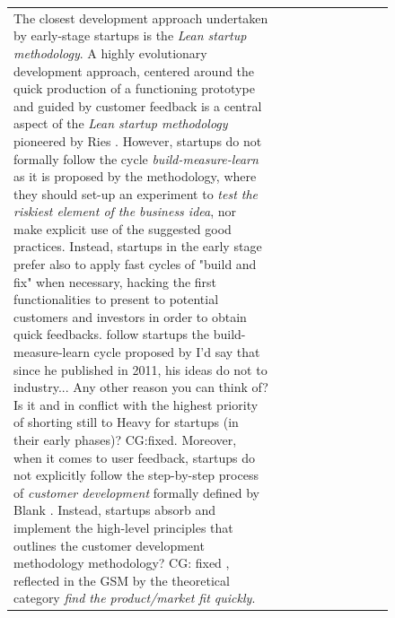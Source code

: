 \documentclass[12pt,journal,compsoc]{../sty/IEEEtran}
\begin{document}
\begin{table}[!t]
\begin{figure}[!t]
\begin{compactitem}
\begin{table}[!t]
\begin{tabular}{|l||c||c||c||c||c||c||c||c||c|}
The closest development approach undertaken by early-stage startups is  the
\textit{Lean startup methodology}.  A highly evolutionary development  approach,
centered around the quick production of a functioning prototype and  guided by
customer feedback is a central aspect of the \textit{Lean startup  methodology}
pioneered by Ries \cite{Ries2011}. However, startups do not  formally follow the
cycle \textit{build-measure-learn} as it is proposed by the  methodology, where
they should set-up an experiment to \textit{test the riskiest  element of the
business idea}, nor make explicit use of the suggested good  practices. Instead,
startups in the early stage prefer also to apply fast cycles of "build and fix"
when necessary, hacking the first functionalities to present to potential
customers and investors in order to obtain quick feedbacks. %
follow startups the build-measure-learn cycle proposed by  %
I'd say that since he published in 2011, his ideas do not  %
to industry... Any other reason you can think of? Is it  %
and in conflict with the highest priority of shorting  %
still to Heavy for startups (in their early phases)? CG:fixed. Moreover, when it
comes to user feedback, startups do  not explicitly follow the step-by-step
process of \textit{customer development} formally defined by Blank
\cite{Blank2005}. Instead, startups absorb and  implement the high-level
principles that outlines the customer development methodology%
methodology? CG: fixed , reflected in the GSM by the theoretical category
\textit{find the  product/market fit quickly}.



\end{tabular}
\end{table}
\end{compactitem}
\end{figure}
\end{table}
\end{document}
